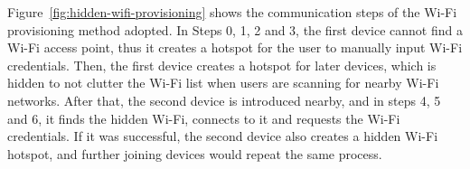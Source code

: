 Figure~\ref{fig:hidden-wifi-provisioning} shows the communication steps of the Wi-Fi provisioning method adopted. In Steps 0, 1, 2 and 3, the first device cannot find a Wi-Fi access point, thus it creates a hotspot for the user to manually input Wi-Fi credentials. Then, the first device creates a hotspot for later devices, which is hidden to not clutter the Wi-Fi list when users are scanning for nearby Wi-Fi networks. After that, the second device is introduced nearby, and in steps 4, 5 and 6, it finds the hidden Wi-Fi, connects to it and requests the Wi-Fi credentials. If it was successful, the second device also creates a hidden Wi-Fi hotspot, and further joining devices would repeat the same process.

